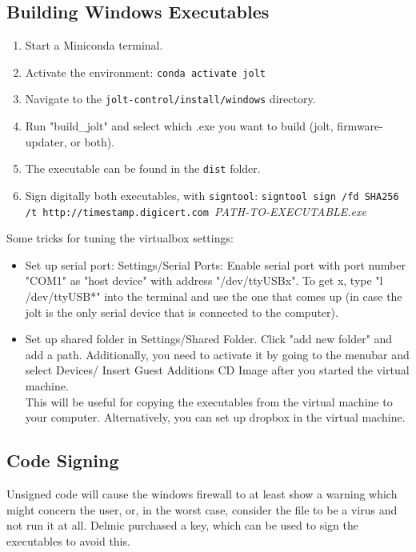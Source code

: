 \documentclass[]{article}
\begin{document}
\subsection{Building Windows Executables}
\begin{enumerate}
	\item Start a Miniconda terminal.
	\item Activate the environment: \texttt{conda activate jolt}
	\item Navigate to the \texttt{jolt-control/install/windows} directory.
	\item Run "build\_jolt" and select which .exe you want to build (jolt, firmware-updater, or both).
	\item The executable can be found in the \texttt{dist} folder.
	\item Sign digitally both executables, with \texttt{signtool}: \texttt{signtool sign /fd SHA256 /t http://timestamp.digicert.com }\emph{PATH-TO-EXECUTABLE.exe}
\end{enumerate}

Some tricks for tuning the virtualbox settings:
\begin{itemize}
	\item Set up serial port: Settings/Serial Ports: Enable serial port with port number "COM1" as "host device" with address "/dev/ttyUSBx". To get x, type "l /dev/ttyUSB*" into the terminal and use the one that comes up (in case the jolt is the only serial device that is connected to the computer).
	\item Set up shared folder in Settings/Shared Folder. Click "add new folder" and add a path. Additionally, you need to activate it by going to the menubar and select Devices/ Insert Guest Additions CD Image after you started the virtual machine.\\
	This will be useful for copying the executables from the virtual machine to your computer. Alternatively, you can set up dropbox in the virtual machine.
\end{itemize}

\subsection{Code Signing}
Unsigned code will cause the windows firewall to at least show a warning which might concern the user, or, in the worst case, consider the file to be a virus and not run it at all. Delmic purchased a key, which can be used to sign the executables to avoid this.
\end{document}
